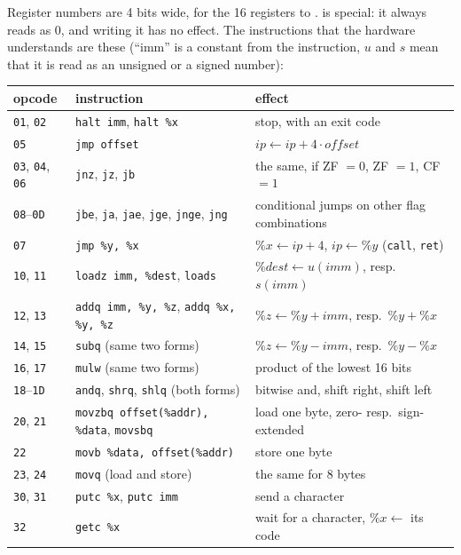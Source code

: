 Register numbers are 4 bits wide, for the 16 registers  to .
 is special: it always reads as 0, and writing it has no effect. The
instructions that the hardware understands are these (``imm'' is a constant
from the instruction, $u$ and $s$ mean that it is read as an unsigned or a
signed number):

\begin{center}
\small
\begin{tabular}{@{}l@{\quad}l@{\quad}l@{}}
\toprule
opcode & instruction & effect \\
\midrule
\texttt{01}, \texttt{02} & \texttt{halt imm}, \texttt{halt \%x} & stop, with an exit code \\
\texttt{05} & \texttt{jmp offset} & $\mathit{ip} \gets \mathit{ip} + 4\cdot\mathit{offset}$ \\
\texttt{03}, \texttt{04}, \texttt{06} & \texttt{jnz}, \texttt{jz}, \texttt{jb} & the same, if ZF $=0$, ZF $=1$, CF $=1$ \\
\texttt{08}--\texttt{0D} & \texttt{jbe}, \texttt{ja}, \texttt{jae}, \texttt{jge}, \texttt{jnge}, \texttt{jng} & conditional jumps on other flag combinations\\
\texttt{07} & \texttt{jmp \%y, \%x} & $\%x \gets \mathit{ip}+4$, $\mathit{ip} \gets \%y$ (\texttt{call}, \texttt{ret}) \\
\texttt{10}, \texttt{11} & \texttt{loadz imm, \%dest}, \texttt{loads} & $\%\mathit{dest} \gets u(\mathit{imm})$, resp.\ $s(\mathit{imm})$ \\
\texttt{12}, \texttt{13} & \texttt{addq imm, \%y, \%z}, \texttt{addq \%x, \%y, \%z} & $\%z \gets \%y + \mathit{imm}$, resp.\ $\%y + \%x$ \\
\texttt{14}, \texttt{15} & \texttt{subq} (same two forms) & $\%z \gets \%y - \mathit{imm}$, resp.\ $\%y - \%x$ \\
\texttt{16}, \texttt{17} & \texttt{mulw} (same two forms) & product of the lowest 16 bits \\
\texttt{18}--\texttt{1D} & \texttt{andq}, \texttt{shrq}, \texttt{shlq} (both forms) & bitwise and, shift right, shift left \\
\texttt{20}, \texttt{21} & \texttt{movzbq offset(\%addr), \%data}, \texttt{movsbq} & load one byte, zero- resp.\ sign-extended \\
\texttt{22} & \texttt{movb \%data, offset(\%addr)} & store one byte \\
\texttt{23}, \texttt{24} & \texttt{movq} (load and store) & the same for 8 bytes \\
\texttt{30}, \texttt{31} & \texttt{putc \%x}, \texttt{putc imm} & send a character \\
\texttt{32} & \texttt{getc \%x} & wait for a character, $\%x \gets$ its code \\
\bottomrule
\end{tabular}
\end{center}

